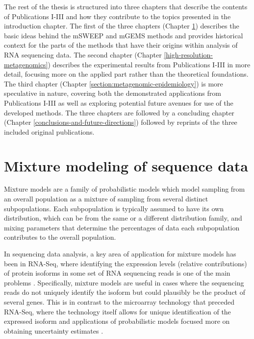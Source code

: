 \documentclass[officiallayout]{tktla}
\begin{document}
The rest of the thesis is structured into three chapters that describe
the contents of Publications I-III and how they contribute to the
topics presented in the introduction chapter. The first of the three
chapters (Chapter \ref{mixture-modelling-of-sequence-data}) describes the
basic ideas behind the mSWEEP and mGEMS methods and provides
historical context for the parts of the methods that have their
origins within analysis of RNA sequencing data. The second chapter
(Chapter \ref{high-resolution-metagenomics}) describes the experimental
results from Publications I-III in more detail, focusing more on the
applied part rather than the theoretical foundations. The third
chapter (Chapter \ref{section:metagenomic-epidemiology}) is more speculative in
nature, covering both the demonstrated applications from Publications
I-III as well as exploring potential future avenues for use of the
developed methods. The three chapters are followed by a concluding
chapter (Chapter \ref{conclusions-and-future-directions}) followed by reprints
of the three included original publications.

\chapter{Mixture modeling of sequence data}
\label{mixture-modelling-of-sequence-data}

Mixture models are a family of probabilistic models which model
sampling from an overall population as a mixture of sampling from
several distinct subpopulations. Each subpopulation is typically
assumed to have its own distribution, which can be from the same or a
different distribution family, and mixing parameters that determine
the percentages of data each subpopulation contributes to the overall
population.

In sequencing data analysis, a key area of application for mixture
models has been in RNA-Seq, where identifying the expression levels
(relative contributions) of protein isoforms in some set of RNA
sequencing reads is one of the main problems
\citep{garber2011computational, wang2009rna}. Specifically, mixture
models are useful in cases where the sequencing reads do not uniquely
identify the isoform but could plausibly be the product of several
genes. This is in contrast to the microarray technology that preceded
RNA-Seq, where the technology itself allows for unique identification
of the expressed isoform and applications of probabilistic models
focused more on obtaining uncertainty estimates
\citep{rattray2006propagating, liu2007including}.
\end{document}
